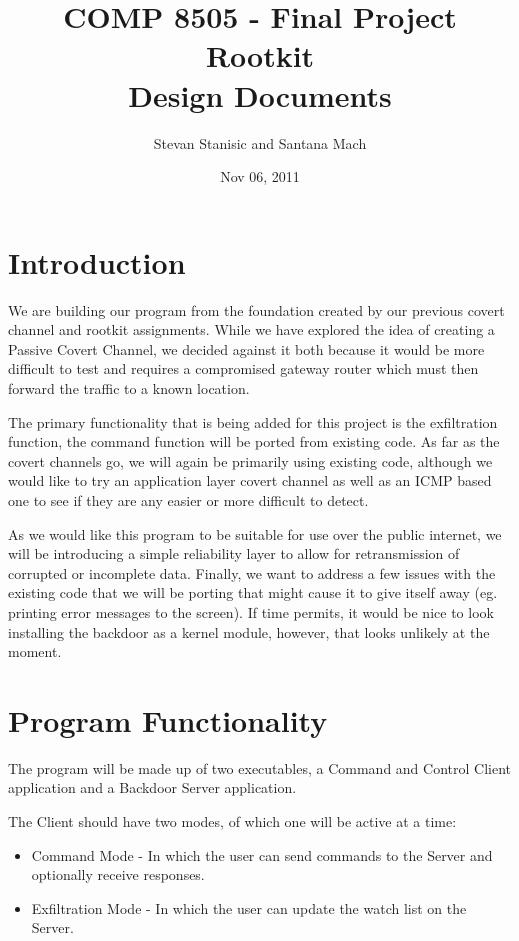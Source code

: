 \documentclass[titlepage]{article}
\begin{document}
\author{Stevan Stanisic and Santana Mach}
\title{COMP 8505 - Final Project \\ Rootkit \\ Design Documents}
\date{Nov 06, 2011}
\maketitle{}

\tableofcontents
\pagebreak

\section{Introduction}

We are building our program from the foundation created by our previous covert channel and rootkit assignments. While we have explored the idea of creating a Passive Covert
Channel, we decided against it both because it would be more difficult to test and requires a compromised gateway router which must then forward the traffic to a known location.

The primary functionality that is being added for this project is the exfiltration function, the command function will be ported from existing code. As far as the covert channels go, we will again be primarily using existing code, although we would like to try an application layer covert channel as well as an ICMP based one to see if they are any easier or more difficult to detect.

As we would like this program to be suitable for use over the public internet, we will be introducing a simple reliability layer to allow for retransmission of corrupted or incomplete data.
Finally, we want to address a few issues with the existing code that we will be porting that might cause it to give itself away (eg. printing error messages to the screen). If time permits,
it would be nice to look installing the backdoor as a kernel module, however, that looks unlikely at the moment.

\section{Program Functionality}

The program will be made up of two executables, a Command and Control Client application and a Backdoor Server application.

The Client should have two modes, of which one will be active at a time:
\begin{itemize}
  \item Command Mode - In which the user can send commands to the Server and optionally receive responses.
  \item Exfiltration Mode - In which the user can update the watch list on the Server.
\end{itemize}
\end{document}
